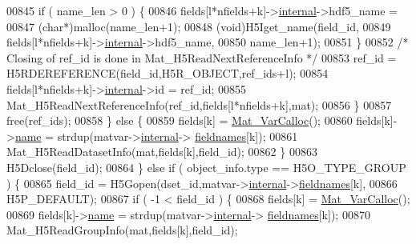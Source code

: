 \begin{DoxyCode}
00845                         \textcolor{keywordflow}{if} ( name\_len > 0 ) \{
00846                             fields[l*nfields+k]->\hyperlink{group___m_a_t_a6e97e3ed9f40c49322c18561c2a94e92}{internal}->hdf5\_name =
00847                                 (\textcolor{keywordtype}{char}*)malloc(name\_len+1);
00848                             (void)H5Iget\_name(field\_id,
00849                                 fields[l*nfields+k]->\hyperlink{namespaceinternal}{internal}->hdf5\_name,
00850                                 name\_len+1);
00851                         \}
00852                         \textcolor{comment}{/* Closing of ref\_id is done in Mat\_H5ReadNextReferenceInfo */}
00853                         ref\_id = H5RDEREFERENCE(field\_id,H5R\_OBJECT,ref\_ids+l);
00854                         fields[l*nfields+k]->\hyperlink{group___m_a_t_a6e97e3ed9f40c49322c18561c2a94e92}{internal}->id = ref\_id;
00855                         Mat\_H5ReadNextReferenceInfo(ref\_id,fields[l*nfields+k],mat);
00856                     \}
00857                     free(ref\_ids);
00858                 \} \textcolor{keywordflow}{else} \{
00859                     fields[k] = \hyperlink{group___m_a_t_gae7c9c3699f6e9c31a9c490300013098c}{Mat\_VarCalloc}();
00860                     fields[k]->\hyperlink{group___m_a_t_a5d4b55b041e3b4fb50c04337f05ad909}{name} = strdup(matvar->\hyperlink{group___m_a_t_a6e97e3ed9f40c49322c18561c2a94e92}{internal}->
      \hyperlink{structmatvar__internal_a7574d000bfc98ad4860ae6590b8d4985}{fieldnames}[k]);
00861                     Mat\_H5ReadDatasetInfo(mat,fields[k],field\_id);
00862                 \}
00863                 H5Dclose(field\_id);
00864             \} \textcolor{keywordflow}{else} \textcolor{keywordflow}{if} ( object\_info.type == H5O\_TYPE\_GROUP ) \{
00865                 field\_id = H5Gopen(dset\_id,matvar->\hyperlink{group___m_a_t_a6e97e3ed9f40c49322c18561c2a94e92}{internal}->\hyperlink{structmatvar__internal_a7574d000bfc98ad4860ae6590b8d4985}{fieldnames}[k],
00866                                    H5P\_DEFAULT);
00867                 \textcolor{keywordflow}{if} ( -1 < field\_id ) \{
00868                     fields[k] = \hyperlink{group___m_a_t_gae7c9c3699f6e9c31a9c490300013098c}{Mat\_VarCalloc}();
00869                     fields[k]->\hyperlink{group___m_a_t_a5d4b55b041e3b4fb50c04337f05ad909}{name} = strdup(matvar->\hyperlink{group___m_a_t_a6e97e3ed9f40c49322c18561c2a94e92}{internal}->
      \hyperlink{structmatvar__internal_a7574d000bfc98ad4860ae6590b8d4985}{fieldnames}[k]);
00870                     Mat\_H5ReadGroupInfo(mat,fields[k],field\_id);

\end{DoxyCode}
